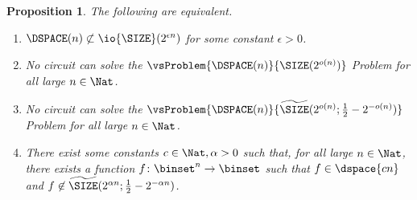 \documentclass[11pt]{article}
\numberwithin{equation}{section}
\newtheorem{proposition}[theorem]{Proposition}
\theoremstyle{definition}
\theoremstyle{plain}
\begin{document}
\begin{proposition}
  \label{prop_NonproperKS}
  The following are equivalent.
  \begin{enumerate}
    \item
          \label{item_DSPACElowerbound}
          $\DSPACE(n) \not\subset \io{\SIZE}(2^{\epsilon n})$ for some constant  $\epsilon> 0$.
    \item
          \label{item_NondisjointDSPACESIZE}
          No circuit can solve
          the $\vsProblem{\DSPACE(n)}{{\SIZE}(2^{o(n)})}$ Problem for all large $n \in \Nat$.
    \item
          \label{item_NondisjointDSPACEApproxSIZE}
          No circuit can solve
          the $\vsProblem{\DSPACE(n)}{\widetilde{\SIZE}(2^{o(n)}; \frac{1}{2} - 2^{-o(n)})}$ Problem for all large $n \in \Nat$.
    \item
          \label{item_NondisjointDSPACEApproxSIZERestated}
          There exist some constants $c \in \Nat, \alpha > 0$ such that,
          for all large $n \in \Nat$,
          there exists a function $f \colon \binset^n \to \binset$ such that
          $f \in \dspace{c n}$
          and $f \not\in \widetilde{\SIZE}(2^{\alpha n}; \frac{1}{2} - 2^{-\alpha n})$.
  \end{enumerate}
\end{proposition}
\end{document}
